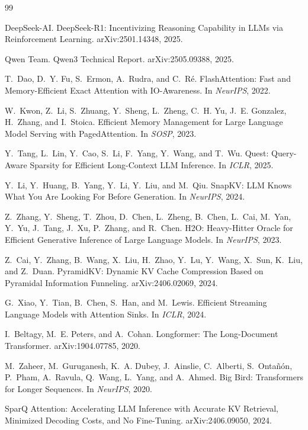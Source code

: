 \documentclass[11pt]{article}
\begin{document}
\begin{thebibliography}{99}\small

DeepSeek-AI. DeepSeek-R1: Incentivizing Reasoning Capability in LLMs via Reinforcement Learning. arXiv:2501.14348, 2025.

Qwen Team. Qwen3 Technical Report. arXiv:2505.09388, 2025.

T.~Dao, D.~Y. Fu, S.~Ermon, A.~Rudra, and C.~R\'{e}. FlashAttention: Fast and Memory-Efficient Exact Attention with IO-Awareness. In \emph{NeurIPS}, 2022.

W.~Kwon, Z.~Li, S.~Zhuang, Y.~Sheng, L.~Zheng, C.~H. Yu, J.~E. Gonzalez, H.~Zhang, and I.~Stoica. Efficient Memory Management for Large Language Model Serving with PagedAttention. In \emph{SOSP}, 2023.

Y.~Tang, L.~Lin, Y.~Cao, S.~Li, F.~Yang, Y.~Wang, and T.~Wu. Quest: Query-Aware Sparsity for Efficient Long-Context LLM Inference. In \emph{ICLR}, 2025.

Y.~Li, Y.~Huang, B.~Yang, Y.~Li, Y.~Liu, and M.~Qiu. SnapKV: LLM Knows What You Are Looking For Before Generation. In \emph{NeurIPS}, 2024.

Z.~Zhang, Y.~Sheng, T.~Zhou, D.~Chen, L.~Zheng, B.~Chen, L.~Cai, M.~Yan, Y.~Yu, J.~Tang, J.~Xu, P.~Zhang, and R.~Chen. H2O: Heavy-Hitter Oracle for Efficient Generative Inference of Large Language Models. In \emph{NeurIPS}, 2023.

Z.~Cai, Y.~Zhang, B.~Wang, X.~Liu, H.~Zhao, Y.~Lu, Y.~Wang, X.~Sun, K.~Liu, and Z.~Duan. PyramidKV: Dynamic KV Cache Compression Based on Pyramidal Information Funneling. arXiv:2406.02069, 2024.

G.~Xiao, Y.~Tian, B.~Chen, S.~Han, and M.~Lewis. Efficient Streaming Language Models with Attention Sinks. In \emph{ICLR}, 2024.

I.~Beltagy, M.~E. Peters, and A.~Cohan. Longformer: The Long-Document Transformer. arXiv:1904.07785, 2020.

M.~Zaheer, M.~Guruganesh, K.~A. Dubey, J.~Ainslie, C.~Alberti, S.~Onta\~{n}\'{o}n, P.~Pham, A.~Ravula, Q.~Wang, L.~Yang, and A.~Ahmed. Big Bird: Transformers for Longer Sequences. In \emph{NeurIPS}, 2020.

SparQ Attention: Accelerating LLM Inference with Accurate KV Retrieval, Minimized Decoding Costs, and No Fine-Tuning. arXiv:2406.09050, 2024.


\end{thebibliography}
\end{document}
